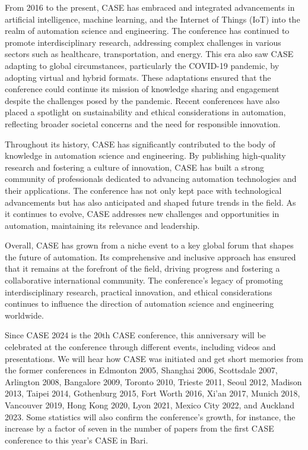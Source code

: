 \documentclass[
	openany, %
	parskip=full, %
	12pt, %
	a4paper, %
]{conferencebooklet} %
\begin{document}
From 2016 to the present, CASE has embraced and integrated advancements in artificial intelligence, machine learning, and the Internet of Things (IoT) into the realm of automation science and engineering. The conference has continued to promote interdisciplinary research, addressing complex challenges in various sectors such as healthcare, transportation, and energy. This era also saw CASE adapting to global circumstances, particularly the COVID-19 pandemic, by adopting virtual and hybrid formats. These adaptations ensured that the conference could continue its mission of knowledge sharing and engagement despite the challenges posed by the pandemic. Recent conferences have also placed a spotlight on sustainability and ethical considerations in automation, reflecting broader societal concerns and the need for responsible innovation.

Throughout its history, CASE has significantly contributed to the body of knowledge in automation science and engineering. By publishing high-quality research and fostering a culture of innovation, CASE has built a strong community of professionals dedicated to advancing automation technologies and their applications. The conference has not only kept pace with technological advancements but has also anticipated and shaped future trends in the field. As it continues to evolve, CASE addresses new challenges and opportunities in automation, maintaining its relevance and leadership.

Overall, CASE has grown from a niche event to a key global forum that shapes the future of automation. Its comprehensive and inclusive approach has ensured that it remains at the forefront of the field, driving progress and fostering a collaborative international community. The conference’s legacy of promoting interdisciplinary research, practical innovation, and ethical considerations continues to influence the direction of automation science and engineering worldwide.

Since CASE 2024 is the 20th CASE conference, this anniversary will be celebrated at the conference through different events, including videos and presentations. We will hear how CASE was initiated and get short memories from the former conferences in Edmonton 2005, Shanghai 2006, Scottsdale 2007, Arlington 2008, Bangalore 2009, Toronto 2010, Trieste 2011, Seoul 2012, Madison 2013, Taipei 2014, Gothenburg 2015, Fort Worth 2016, Xi’an 2017, Munich 2018, Vancouver 2019, Hong Kong 2020, Lyon 2021, Mexico City 2022, and Auckland 2023. Some statistics will also confirm the conference's growth, for instance, the increase by a factor of seven in the number of papers from the first CASE conference to this year’s CASE in Bari.
\end{document}
